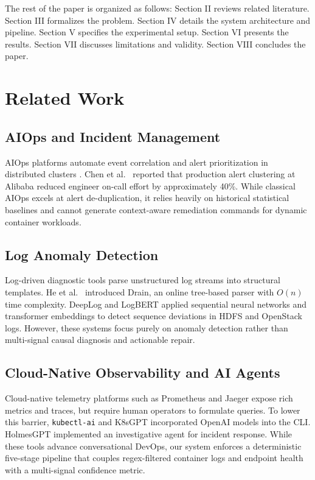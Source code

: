 \documentclass[12pt,onecolumn,draftclsnofoot]{IEEEtran}
\begin{document}
The rest of the paper is organized as follows: Section II reviews related literature. Section III formalizes the problem. Section IV details the system architecture and pipeline. Section V specifies the experimental setup. Section VI presents the results. Section VII discusses limitations and validity. Section VIII concludes the paper.

\section{Related Work}

\subsection{AIOps and Incident Management}
AIOps platforms automate event correlation and alert prioritization in distributed clusters \cite{gartner2017aiops,zhang2022aiops}. Chen et al.\ \cite{chen2020aiops} reported that production alert clustering at Alibaba reduced engineer on-call effort by approximately 40\%. While classical AIOps excels at alert de-duplication, it relies heavily on historical statistical baselines and cannot generate context-aware remediation commands for dynamic container workloads.

\subsection{Log Anomaly Detection}
Log-driven diagnostic tools parse unstructured log streams into structural templates. He et al.\ \cite{he2017drain} introduced Drain, an online tree-based parser with $O(n)$ time complexity. DeepLog \cite{du2017deeplog} and LogBERT \cite{guo2021logbert} applied sequential neural networks and transformer embeddings to detect sequence deviations in HDFS and OpenStack logs. However, these systems focus purely on anomaly detection rather than multi-signal causal diagnosis and actionable repair.

\subsection{Cloud-Native Observability and AI Agents}
Cloud-native telemetry platforms such as Prometheus \cite{prometheus2015} and Jaeger \cite{jaeger2017} expose rich metrics and traces, but require human operators to formulate queries. To lower this barrier, \texttt{kubectl-ai} \cite{kubectlai2023} and K8sGPT \cite{k8sgpt2023} incorporated OpenAI models into the CLI. HolmesGPT \cite{holmesgpt2024} implemented an investigative agent for incident response. While these tools advance conversational DevOps, our system enforces a deterministic five-stage pipeline that couples regex-filtered container logs and endpoint health with a multi-signal confidence metric.
\end{document}
